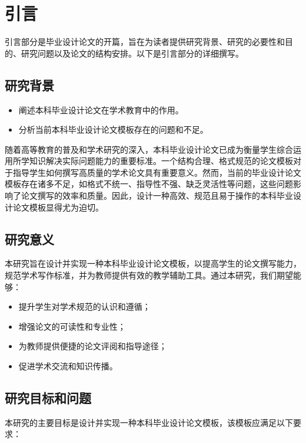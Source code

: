 \documentclass[../main.tex]{subfiles}
\begin{document}
\normalsize

\chapter{引言}

引言部分是毕业设计论文的开篇，旨在为读者提供研究背景、研究的必要性和目的、研究问题以及论文的结构安排。以下是引言部分的详细撰写。

\section{研究背景}

\begin{itemize}
    \item 阐述本科毕业设计论文在学术教育中的作用。
    \item 分析当前本科毕业设计论文模板存在的问题和不足。
\end{itemize}

随着高等教育的普及和学术研究的深入，本科毕业设计论文已成为衡量学生综合运用所学知识解决实际问题能力的重要标准。一个结构合理、格式规范的论文模板对于指导学生如何撰写高质量的学术论文具有重要意义。然而，当前的毕业设计论文模板存在诸多不足，如格式不统一、指导性不强、缺乏灵活性等问题，这些问题影响了论文撰写的效率和质量。因此，设计一种高效、规范且易于操作的本科毕业设计论文模板显得尤为迫切。\cite{cai_coala_2024}

\section{研究意义}

本研究旨在设计并实现一种本科毕业设计论文模板，以提高学生的论文撰写能力，规范学术写作标准，并为教师提供有效的教学辅助工具。通过本研究，我们期望能够：

\begin{itemize}
    \item 提升学生对学术规范的认识和遵循；
    \item 增强论文的可读性和专业性；
    \item 为教师提供便捷的论文评阅和指导途径；
    \item 促进学术交流和知识传播。
\end{itemize}

\section{研究目标和问题}

本研究的主要目标是设计并实现一种本科毕业设计论文模板，该模板应满足以下要求：
\end{document}
